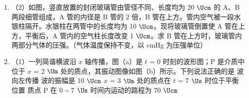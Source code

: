 \documentclass[\gkver]{gaokaozhenti}
\begin{document}
\begin{enumerate}
{B．根据理想气体状态方程可知：等压膨胀后气体温度升高，内能增大，等温压缩温度不变，内能不变，故末状态与初始状态相比内能增加，故 B 错误；

C．根据理想气体状态方程可知：等容减压过程温度降低，内能减小；等压膨胀过程温度升高，末状态的温度有可能和初状态的温度相等，内能相等，故 C 正确；

D．根据理想气体状态方程可知：等容增压过程温度升高；等压压缩过程温度降低，末状态的温度有可能和初状态的温度相等，内能相等，故 D 正确；

E．根据理想气体状态方程可知：等容增压过程温度升高；等温膨胀过程温度不变，故末状态的内能大于初状态的内能，故 E 错误。

故选 ACD。
}

\item[]
（2）如图，竖直放置的封闭玻璃管由管径不同、长度均为 20 $\Ucm$ 的 A、B 两段细管组成，A 管的内径是 B 管的 2 倍，B 管在上方。管内空气被一段水银柱隔开。水银柱在两管中的长度均为 10 $\Ucm$。现将玻璃管倒置使 A 管在上方，平衡后，A 管内的空气柱长度改变 1 $\Ucm$。求 B 管在上方时，玻璃管内两部分气体的压强。（气体温度保持不变，以 cmHg 为压强单位）

\item
（1）一列简谐横波沿 $x$ 轴传播，图（a）是 $t$ = 0 时刻的波形图；P 是介质中位于 $x$ = 2 $\Um$ 处的质点，其振动图像如图（b）所示。下列说法正确的是
\onepicture[w=7.4cm]{}
{波向左传播}
{波的振幅是 10 $\Ucm$}
{$x$ = 3 $\Um$ 处的质点在 $t$ = 7 $\Us$ 时位于平衡位置}
{质点 P 在 0 \textasciitilde{} 7 $\Us$ 时间内运动的路程为 70 $\Ucm$}
\end{enumerate}
\end{document}
